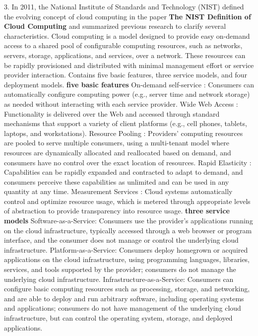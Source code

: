 \documentclass[a4paper,twoside]{scrbook}
\begin{document}
\begin{CJK}{UTF8}{gbsn}
3. In 2011, the National Institute of Standards and Technology (NIST) defined the evolving concept of cloud computing in the paper \textbf {The NIST Definition of Cloud Computing}\cite{mell2011nist} and summarized previous research to clarify several characteristics. Cloud computing is a model designed to provide easy on-demand access to a shared pool of configurable computing resources, such as networks, servers, storage, applications, and services, over a network. These resources can be rapidly provisioned and distributed with minimal management effort or service provider interaction. Contains five basic features, three service models, and four deployment models.
\textbf{five basic features}
On-demand self-service : Consumers can automatically configure computing power (e.g., server time and network storage) as needed without interacting with each service provider.
Wide Web Access : Functionality is delivered over the Web and accessed through standard mechanisms that support a variety of client platforms (e.g., cell phones, tablets, laptops, and workstations).
Resource Pooling : Providers' computing resources are pooled to serve multiple consumers, using a multi-tenant model where resources are dynamically allocated and reallocated based on demand, and consumers have no control over the exact location of resources.
Rapid Elasticity : Capabilities can be rapidly expanded and contracted to adapt to demand, and consumers perceive these capabilities as unlimited and can be used in any quantity at any time.
Measurement Services : Cloud systems automatically control and optimize resource usage, which is metered through appropriate levels of abstraction to provide transparency into resource usage.
\textbf {three service models}
Software-as-a-Service: Consumers use the provider's applications running on the cloud infrastructure, typically accessed through a web browser or program interface, and the consumer does not manage or control the underlying cloud infrastructure.
Platform-as-a-Service: Consumers deploy homegrown or acquired applications on the cloud infrastructure, using programming languages, libraries, services, and tools supported by the provider; consumers do not manage the underlying cloud infrastructure.
Infrastructure-as-a-Service: Consumers can configure basic computing resources such as processing, storage, and networking, and are able to deploy and run arbitrary software, including operating systems and applications; consumers do not have management of the underlying cloud infrastructure, but can control the operating system, storage, and deployed applications.

\end{CJK}
\end{document}
